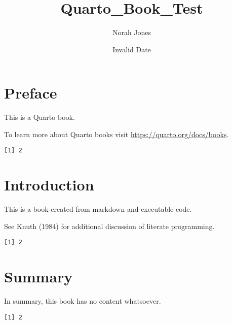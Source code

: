 \documentclass[
  11pt,
  letterpaper,
]{scrbook}
\title{Quarto\_Book\_Test}
\author{Norah Jones}
\date{Invalid Date}
\renewcommand*\contentsname{Table of contents}
\newcommand\contentsname{Table of contents}
\begin{document}
\frontmatter
\maketitle
\ifdefined\Shaded\renewenvironment{Shaded}{\begin{tcolorbox}[enhanced, sharp corners, boxrule=0pt, interior hidden, borderline west={3pt}{0pt}{shadecolor}, breakable, frame hidden]}{\end{tcolorbox}}\fi

\renewcommand*\contentsname{Table of contents}
{
\setcounter{tocdepth}{2}
\tableofcontents
}
\listoffigures
\listoftables
{}
\mainmatter
{}

\hypertarget{preface}{%
\chapter*{Preface}\label{preface}}


This is a Quarto book.

To learn more about Quarto books visit
\url{https://quarto.org/docs/books}.

\begin{verbatim}
[1] 2
\end{verbatim}


\hypertarget{introduction}{%
\chapter{Introduction}\label{introduction}}

This is a book created from markdown and executable code.

See Knuth (1984) for additional discussion of literate programming.

\begin{verbatim}
[1] 2
\end{verbatim}


\hypertarget{summary}{%
\chapter{Summary}\label{summary}}

In summary, this book has no content whatsoever.

\begin{verbatim}
[1] 2
\end{verbatim}
\end{document}
